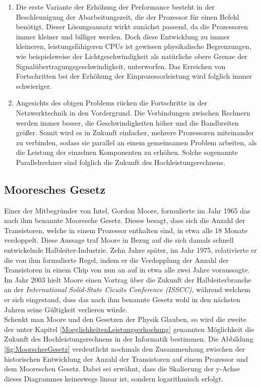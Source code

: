 			\begin{enumerate}
				\item Die erste Variante der Erhöhung der Performance besteht in der Beschleunigung der Abarbeitungszeit, die der Prozessor für einen Befehl benötigt. Dieser Lösungsansatz wirkt zunächst passend, da die Prozessoren immer kleiner und billiger werden. Doch diese Entwicklung zu immer kleineren, leistungsfähigeren CPUs ist gewissen physikalische Begrenzungen, wie beispielsweise der Lichtgeschwindigkeit als natürliche obere Grenze der Signalübertragungsgeschwindigkeit, unterworfen. Das Erreichen von Fortschritten bei der Erhöhung der Einprozessorleistung wird folglich immer schwieriger. \cite{GrundlagenParallelisierung}
				\item Angesichts des obigen Problems rücken die Fortschritte in der Netzwerktechnik in den Vordergrund. Die Verbindungen zwischen Rechnern werden immer besser, die Geschwindigkeiten höher und die Bandbreiten größer. Somit wird es in Zukunft einfacher, mehrere Prozessoren miteinander zu verbinden, sodass sie parallel an einem gemeinsamen Problem arbeiten, als die Leistung der einzelnen Komponenten zu erhöhen. \cite{GrundlagenParallelisierung} Solche sogenannte Parallelrechner sind folglich die Zukunft des Hochleistungsrechnens.
			\end{enumerate}

		\subsection{Mooresches Gesetz}
		
			Einer der Mitbegründer von Intel, Gordon Moore, formulierte im Jahr 1965 das nach ihm benannte Mooresche Gesetz. Dieses besagt, dass sich die Anzahl der Transistoren, welche in einem Prozessor enthalten sind, in etwa alle 18 Monate verdoppelt. Diese Aussage traf Moore in Bezug auf die sich damals schnell entwickelnde Halbleiter-Industrie. Zehn Jahre später, im Jahr 1975, relativierte er die von ihm formulierte Regel, indem er die Verdopplung der Anzahl der Transistoren in einem Chip von nun an auf in etwa alle zwei Jahre voraussagte.\\
			Im Jahr 2003 hielt Moore einen Vortrag über die Zukunft der Halbleiterbranche an der \textit{International Solid-State Cicuits Conference (ISSCC)}, während welchem er sich eingestand, dass das nach ihm benannte Gesetz wohl in den nächsten Jahren seine Gültigkeit verlieren würde. \cite{EndeHardwareMiniaturisierung}\\
			Schenkt man Moore und den Gesetzen der Physik Glauben, so wird die zweite der unter Kapitel \ref{MoeglichkeitenLeistungserhoehung} genannten Möglichkeit die Zukunft des Hochleistungsrechnens in der Informatik bestimmen.
			Die Abbildung \ref{fig:MoorschesGesetz} verdeutlicht nochmals den Zusammenhang zwischen der historischen Entwicklung der Anzahl der Transistoren auf einem Prozessor und dem Mooreschen Gesetz. Dabei sei erwähnt, dass die Skalierung der y-Achse dieses Diagrammes keineswegs linear ist, sondern logarithmisch erfolgt.
		
